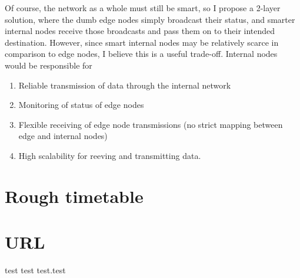\documentclass{article}
\begin{document}
Of course, the network as a whole must still be smart, so I propose a 2-layer solution, where the dumb edge nodes simply broadcast their status, and smarter internal nodes receive those broadcasts and pass them on to their intended destination. However, since smart internal nodes may be relatively scarce in comparison to edge nodes, I believe this is a useful trade-off. Internal nodes would be responsible for
\begin{enumerate}
	\item Reliable transmission of data through the internal network
	\item Monitoring of status of edge nodes
	\item Flexible receiving of edge node transmissions (no strict mapping between edge and internal nodes)
	\item High scalability for reeving and transmitting data.
\end{enumerate}

\section{Rough timetable}

\begin{enumerate}

\end{enumerate}

\section{URL}
test test test.test
\end{document}
